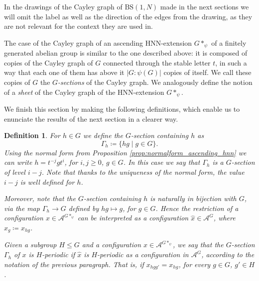 \documentclass[cupthm,crop,info]{CUP-JNL-ETS}%
\theoremstyle{cupplain}
\theoremstyle{cupdefinition}
\newtheorem{definition}{Definition}[section]
\theoremstyle{cupremark}
\theoremstyle{cupproof}
\numberwithin{equation}{section}
\newcommand{\BS}[1][N]{\mathrm{BS}(1,#1)}
\begin{document}
In the drawings of the Cayley graph of $\BS$ made in the next sections we will omit the label as well as the direction of the edges from the drawing, as they are not relevant for the context they are used in.

The case of the Cayley graph of an ascending HNN-extension $G*_{\psi}$ of a finitely generated abelian group is similar to the one described above: it is composed of copies of the Cayley graph of $G$ connected through the stable letter $t$, in such a way that each one of them has above it $|G:\psi(G)|$ copies of itself. We call these copies of $G$ the $G$\textit{-sections} of the Cayley graph. We analogously define the notion of a \textit{sheet} of the Cayley graph of the HNN-extension $G*_{\psi}$.

We finish this section by making the following definitions, which enable us to enunciate the results of the next section in a clearer way.
\begin{definition}
	For $h\in G$ we define the \textit{$G$-section containing $h$} as
	$$
	\Gamma_{h}\coloneqq \{hg\mid g\in G \}.
	$$
	Using the normal form from Proposition \ref{prop:normalform_ascending_hnn} we can write $h=t^{-j}gt^i$, for $i,j\ge 0$, $g\in G$. In this case we say that $\Gamma_h$ is a \textit{$G$-section of level $i-j$}. Note that thanks to the uniqueness of the normal form, the value $i-j$ is well defined for $h$.
	
	Moreover, note that the $G$-section containing $h$ is naturally in bijection with $G$, via the map $\Gamma_h\to G$ defined by $hg\mapsto g$, for $g\in G$. Hence the restriction of a configuration $x\in \mathcal{A}^{G*_{\psi}}$ can be interpreted as a configuration $\hat{x}\in \mathcal{A}^{G}$, where $\hat{x}_{g}\coloneqq x_{hg}$.
	
	Given a subgroup $H\leqslant G$ and a configuration $x\in \mathcal{A}^{G*_{\psi}}$, we say that \textit{the $G$-section $\Gamma_h$ of $x$ is $H$-periodic} if $\hat{x}$ is $H$-periodic as a configuration in $\mathcal{A}^{G}$, according to the notation of the previous paragraph. That is, if $x_{hgg'}=x_{hg}$,  for every $g\in G$, $g'\in H$.
\end{definition}
\end{document}
